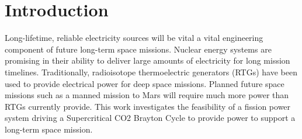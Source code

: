 \section{Introduction}
Long-lifetime, reliable electricity sources will be vital a vital engineering
component of future long-term space missions. Nuclear energy systems are
promising in their ability to deliver large amounts of electricity for long
mission timelines. Traditionally, radioisotope thermoelectric generators (RTGs)
have been used to provide electrical power for deep space missions. Planned
future space missions such as a manned mission to Mars will require much more
power than RTGs currently provide. This work investigates the feasibility of a
fission power system driving a Supercritical CO2 Brayton Cycle to provide power
to support a long-term space mission.
